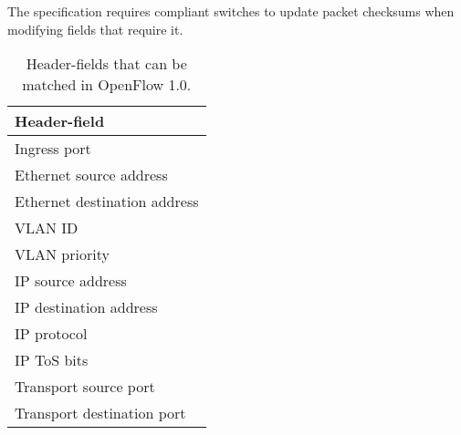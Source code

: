 The specification requires compliant switches to update packet checksums
when modifying fields that require it.

\begin{table}
  \centering
  \begin{tabular}{l}
    \hline
     \textbf{Header-field} \\
    \hline
     Ingress port\index{OpenFlow!match on ingress port} \\

     Ethernet source address\index{OpenFlow!match on Ethernet} \\
     Ethernet destination address\index{OpenFlow!match on Ethernet} \\

     VLAN ID\index{OpenFlow!match on VLAN} \\
     VLAN priority\index{OpenFlow!match on VLAN} \\

     IP source address\index{OpenFlow!match on IP address} \\
     IP destination address\index{OpenFlow!match on IP address} \\
     IP protocol\index{OpenFlow!match on IP protocol} \\
     IP \ac{ToS} bits\index{OpenFlow!match on ToS} \\

     Transport source port\index{OpenFlow!UDP}\index{OpenFlow!TCP}\index{OpenFlow!transport} \\
     Transport destination port \\
    \hline
  \end{tabular}
  \caption{Header-fields that can be matched in OpenFlow 1.0.}
  \label{table:openflow-1.0.headers}
\end{table}

